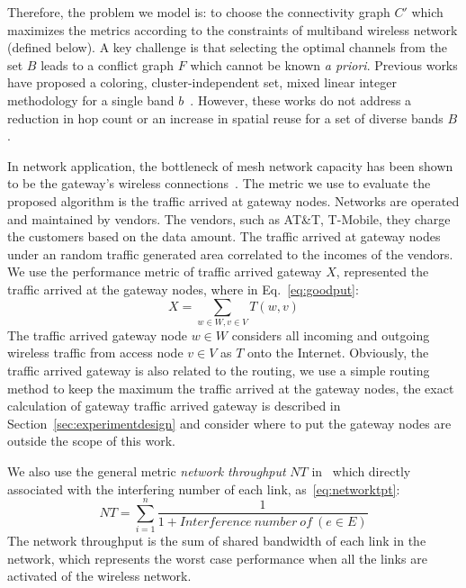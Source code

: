 Therefore, the problem we model is: to choose the connectivity graph $C'$ which maximizes
the metrics according to the constraints of multiband wireless network (defined below).
A key challenge is that selecting the optimal channels from
the set $B$ leads to a conflict graph $F$ which cannot be known {\it a priori}.
Previous works have proposed a coloring, cluster-independent set, mixed linear integer methodology
for a single band $b$~\cite{peng2012efficient,tang2005interference,doraghinejad2014channel}. 
However, these works do not address a reduction in hop count or an increase in spatial reuse for a set of 
diverse bands $B$. 

In network application, the bottleneck of mesh network capacity has been shown to be the gateway's wireless 
connections~\cite{robinson2008adding}.
The metric we use to evaluate the proposed algorithm is the traffic arrived at gateway nodes.
Networks are operated and maintained by vendors.
The vendors, such as AT\&T, T-Mobile, they charge the customers based on the data amount. 
The traffic arrived at gateway nodes under an random traffic generated area 
correlated to the incomes of the vendors. We use the performance metric of 
traffic arrived gateway $X$, represented the traffic arrived at the gateway nodes, where in Eq.~\ref{eq:goodput}:
\begin{equation}
\label{eq:goodput}
X=\sum_{w \in W, v \in V}T(w,v)
\end{equation}
The traffic arrived gateway node $w\in W$ considers all incoming and outgoing wireless traffic 
from access node $v\in V$ as $T$ onto the Internet.
Obviously, the traffic arrived gateway is also related to the routing, we use a simple routing
method to keep the maximum the traffic arrived at the gateway nodes, the exact calculation 
of gateway traffic arrived gateway is described in Section~\ref{sec:experimentdesign} 
and consider where to put the gateway nodes are outside the scope of this work.

We also use the general metric \emph{network throughput} $NT$
in~\cite{tang2005interference,doraghinejad2014channel} 
which directly associated with the interfering number of each link, as~\ref{eq:networktpt}:
\begin{equation}
\label{eq:networktpt}
NT = \sum_{i=1}^{n}\frac{1}{1+Interference\ number\ of\ (e \in E)}
\end{equation}
The network throughput is the sum of shared bandwidth of each link in the network, 
which represents the worst case performance when all the links are activated of 
the wireless network.


